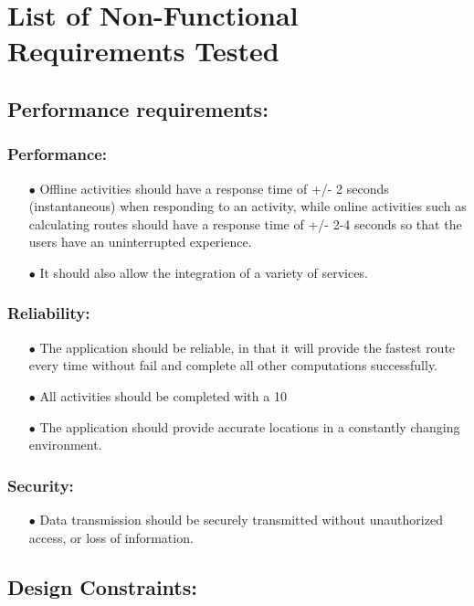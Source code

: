 \documentclass[english]{article}
\begin{document}
	\section{List of Non-Functional Requirements Tested}
	
	\subsection{Performance requirements:}
\subsubsection{Performance:}
	\begin{itemize}
		\item[$\bullet$] Offline activities should have a response time of +/- 2 seconds (instantaneous) when responding to an activity, while online activities such as calculating routes should have a response time of +/- 2-4 seconds so that the users have an uninterrupted experience.
		\item[$\bullet$] It should also allow the integration of a variety of services.
	\end{itemize}

\subsubsection{Reliability:}
\begin{itemize}
\item[$\bullet$]The application should be reliable, in that it will provide the fastest route every time without fail and complete all other computations successfully. 
\item[$\bullet$]All activities should be completed with a 10%
\item[$\bullet$]The application should provide accurate locations in a constantly changing environment.
\end{itemize}

\subsubsection{Security:}
\begin{itemize}
\item[$\bullet$]Data transmission should be securely transmitted without unauthorized access, or loss of information.
\end{itemize}

\subsection{Design Constraints:}
\end{document}
